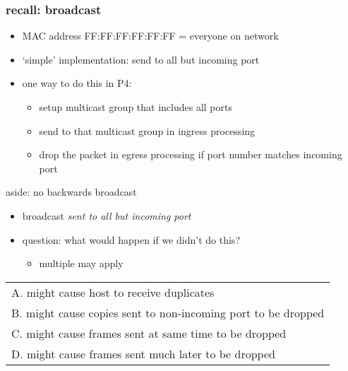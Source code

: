 \usetikzlibrary{arrows.meta,decorations.markings,patterns}

\providecommand{\computer}{%
    \texttt{[image: ../common/Noun\_project\_216.pdf]}
}
\providecommand{\switch}{%
    \texttt{[image: ../common/fig-switch.pdf]}
}
\providecommand{\router}{%
    \texttt{[image: ../common/fig-router.pdf]}
}

\begin{frame}
\frametitle{recall: broadcast}
\begin{itemize}
\item MAC address FF:FF:FF:FF:FF:FF = everyone on network
\item `simple' implementation: send to all but incoming port
\vspace{.5cm}
\item one way to do this in P4:
    \begin{itemize}
    \item setup multicast group that includes all ports
    \item send to that multicast group in ingress processing
    \item drop the packet in egress processing if port number matches incoming port
    \end{itemize}
\end{itemize}
\end{frame}

\begin{frame}[label=noBackwardsQ]{aside: no backwards broadcast}
    \begin{itemize}
    \item broadcast \textit{sent to all but incoming port}
    \item question: what would happen if we didn't do this?
        \begin{itemize}
        \item multiple may apply
        \end{itemize}
    \end{itemize}
\begin{tabular}{l}
A. might cause host to receive duplicates \\
B. might cause copies sent to non-incoming port to be dropped \\
C. might cause frames sent at same time to be dropped \\
D. might cause frames sent much later to be dropped \\
\end{tabular}
\end{frame}

